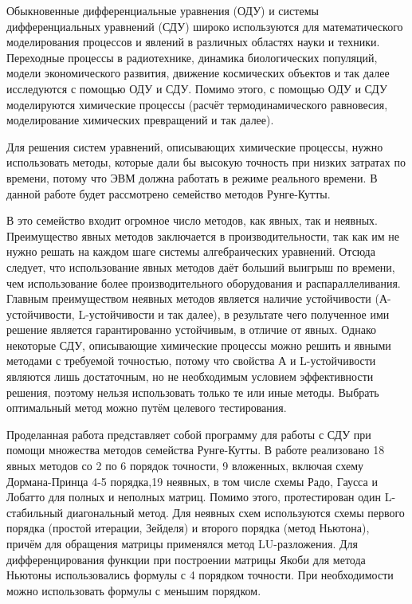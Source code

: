 \vkrIntroduction

Обыкновенные дифференциальные уравнения (ОДУ) и системы дифференциальных уравнений (СДУ) широко используются для математического моделирования процессов и явлений в различных областях науки и техники. Переходные процессы в радиотехнике, динамика биологических популяций, модели экономического развития, движение космических объектов и так далее исследуются с помощью ОДУ и СДУ. Помимо этого, с помощью ОДУ и СДУ моделируются химические процессы (расчёт термодинамического равновесия, моделирование химических превращений и так далее).

Для решения систем уравнений, описывающих химические процессы, нужно использовать методы, которые дали бы высокую точность при низких затратах по времени, потому что ЭВМ должна работать в режиме реального времени. В данной работе будет рассмотрено семейство методов Рунге-Кутты.

В это семейство входит огромное число методов, как явных, так и неявных. Преимущество явных методов заключается в производительности, так как им не нужно решать на каждом шаге системы алгебраических уравнений. Отсюда следует, что использование явных методов даёт больший выигрыш по времени, чем использование более производительного оборудования и распараллеливания. Главным преимуществом неявных методов является наличие устойчивости (А-устойчивости, L-устойчивости и так далее), в результате чего полученное ими решение является гарантированно устойчивым, в отличие от явных. Однако некоторые СДУ, описывающие химические процессы можно решить и явными методами с требуемой точностью, потому что свойства А и L-устойчивости являются лишь достаточным, но не необходимым условием эффективности решения, поэтому нельзя использовать только те или иные методы. Выбрать оптимальный метод можно путём целевого тестирования.

Проделанная работа представляет собой программу для работы с СДУ при помощи множества методов семейства Рунге-Кутты. В работе реализовано 18 явных методов со 2 по 6 порядок точности, 9 вложенных, включая схему Дормана-Принца 4-5 порядка,19 неявных, в том числе схемы Радо, Гаусса и Лобатто для полных и неполных матриц. Помимо этого, протестирован один L-стабильный диагональный метод. Для неявных схем используются схемы первого порядка (простой итерации, Зейделя) и второго порядка (метод Ньютона), причём для обращения матрицы применялся метод LU-разложения. Для дифференцирования функции при построении матрицы Якоби для метода Ньютоны использовались формулы с 4 порядком точности. При необходимости можно использовать формулы с меньшим порядком.

